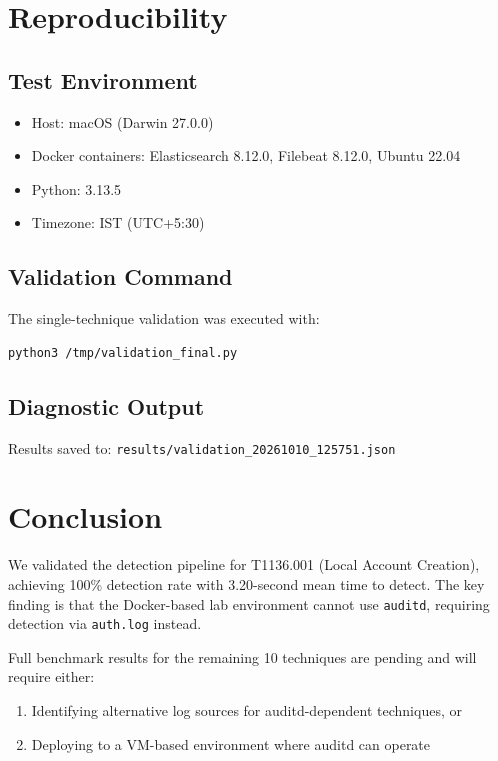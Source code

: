 \documentclass[11pt,a4paper]{article}
\begin{document}
\section{Reproducibility}

\subsection{Test Environment}

\begin{itemize}
    \item Host: macOS (Darwin 27.0.0)
    \item Docker containers: Elasticsearch 8.12.0, Filebeat 8.12.0, Ubuntu 22.04
    \item Python: 3.13.5
    \item Timezone: IST (UTC+5:30)
\end{itemize}

\subsection{Validation Command}

The single-technique validation was executed with:

\begin{lstlisting}[language=bash]
python3 /tmp/validation_final.py
\end{lstlisting}

\subsection{Diagnostic Output}

Results saved to: \texttt{results/validation\_20261010\_125751.json}

\section{Conclusion}

We validated the detection pipeline for T1136.001 (Local Account Creation), achieving 100\% detection rate with 3.20-second mean time to detect. The key finding is that the Docker-based lab environment cannot use \texttt{auditd}, requiring detection via \texttt{auth.log} instead.

Full benchmark results for the remaining 10 techniques are pending and will require either:
\begin{enumerate}
    \item Identifying alternative log sources for auditd-dependent techniques, or
    \item Deploying to a VM-based environment where auditd can operate
\end{enumerate}
\end{document}
